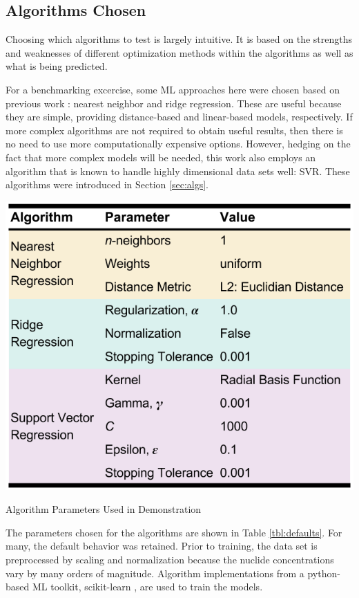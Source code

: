 \subsection{Algorithms Chosen}
\label{sec:choice}

Choosing which algorithms to test is largely intuitive. It is based on the
strengths and weaknesses of different optimization methods within the
algorithms as well as what is being predicted.  

For a benchmarking excercise, some \gls{ML} approaches here were chosen
based on previous work \cite{dayman_feasibility_2013}: nearest neighbor and
ridge regression. These are useful because they are simple, providing
distance-based and linear-based models, respectively. If more complex
algorithms are not required to obtain useful results, then there is no need to
use more computationally expensive options. However, hedging on the fact that
more complex models will be needed, this work also employs an algorithm that is
known to handle highly dimensional data sets well: \acrfull{SVR}.
These algorithms were introduced in Section \ref{sec:algs}. 

\begin{table}[!htb]
  \centering
  \includegraphics[width=0.8\linewidth]{./chapters/method/defaults.png}
  \caption{Algorithm Parameters Used in Demonstration}
  \label{tbl:defaults}
\end{table}

The parameters chosen for the algorithms are shown in Table \ref{tbl:defaults}.
For many, the default behavior was retained. Prior to training, the data set is
preprocessed by scaling and normalization because the nuclide concentrations
vary by many orders of magnitude. Algorithm implementations from a python-based
\gls{ML} toolkit, scikit-learn \cite{scikit}, are used to train the
models.


